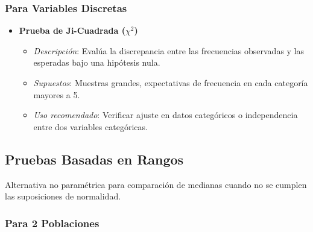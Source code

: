\documentclass{article}
\begin{document}
\subsubsection{Para Variables Discretas}

\begin{itemize}
    \item \textbf{Prueba de Ji-Cuadrada ($\chi^2$)}
          \begin{itemize}
              \item \textit{Descripción}: Evalúa la discrepancia entre las frecuencias observadas y las esperadas bajo una hipótesis nula.
              \item \textit{Supuestos}: Muestras grandes, expectativas de frecuencia en cada categoría mayores a 5.
              \item \textit{Uso recomendado}: Verificar ajuste en datos categóricos o independencia entre dos variables categóricas.
          \end{itemize}
\end{itemize}

\subsection{Pruebas Basadas en Rangos}

Alternativa no paramétrica para comparación de medianas cuando no se cumplen las suposiciones de normalidad.

\subsubsection{Para 2 Poblaciones}
\end{document}
